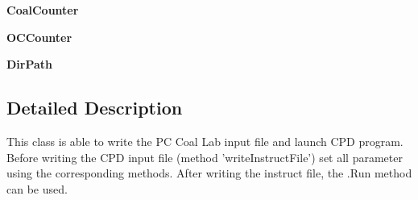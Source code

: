 \begin{DoxyCompactItemize}
\item 
\hypertarget{classPCCL__SetAndLaunch_1_1SetterAndLauncher_af28440dda80da3d778a6172c307353ed}{{\bfseries \-Coal\-Counter}}\label{classPCCL__SetAndLaunch_1_1SetterAndLauncher_af28440dda80da3d778a6172c307353ed}

\item 
\hypertarget{classPCCL__SetAndLaunch_1_1SetterAndLauncher_ad3538b5a2ea4b4d43215be0196dc4477}{{\bfseries \-O\-C\-Counter}}\label{classPCCL__SetAndLaunch_1_1SetterAndLauncher_ad3538b5a2ea4b4d43215be0196dc4477}

\item 
\hypertarget{classPCCL__SetAndLaunch_1_1SetterAndLauncher_a05c3584089018f4c7c422f83848048e4}{{\bfseries \-Dir\-Path}}\label{classPCCL__SetAndLaunch_1_1SetterAndLauncher_a05c3584089018f4c7c422f83848048e4}

\end{DoxyCompactItemize}


\subsection{\-Detailed \-Description}
\begin{DoxyVerb}This class is able to write the PC Coal Lab input file and launch CPD program. Before writing the CPD input file (method 'writeInstructFile') set all parameter using the corresponding methods. After writing the instruct file, the .Run method can be used.\end{DoxyVerb}
 

